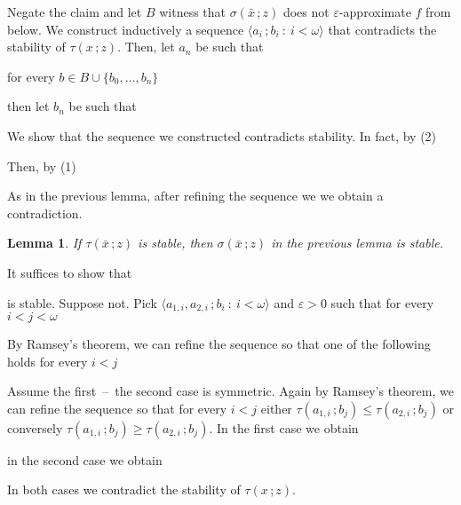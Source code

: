 \documentclass{amsproc}
\makeatletter
\newcounter{thm}
\theoremstyle{mio}
\newtheorem{lemma}[thm]{Lemma}\tcolorboxenvironment{lemma}{mythm}
\providecommand{\proofNameStyle}{\bfseries}
\renewenvironment{proof}[1][\proofname]{\par
  \pushQED{\qed}%
  \normalfont%
  \trivlist
  \item[\hskip\labelsep
        \proofNameStyle
    #1\@addpunct{.}]\ignorespaces
}{%
  \popQED\endtrivlist\@endpefalse
}
\makeatother
\begin{document}
\begin{proof}
  Negate the claim and let $B$ witness that $\sigma(\bar x\,;z)$ does not $\varepsilon$-approximate $f$ from below.
  We construct inductively a sequence $\langle a_i\,;b_i\ :\ i<\omega\rangle$ that contradicts the stability of $\tau(x\,;z)$.
  Then, let $a_n$ be such that

  \hfill for every $b\in B\cup\{b_0,\dots,b_n\}$

  then let $b_n$ be such that


  We show that the sequence we constructed contradicts stability.
  In fact, by (2)


  Then, by (1)


  As in the previous lemma, after refining the sequence we we obtain a contradiction.
\end{proof}

\begin{lemma}
  If $\tau(\bar x\,;z)$ is stable, then $\sigma(\bar x\,;z)$ in the previous lemma is stable. 
\end{lemma}

\begin{proof}
  It suffices to show that


  is stable.
  Suppose not.
  Pick $\langle a_{1,i},a_{2,i}\,;b_i\ :\ i<\omega\rangle$ and $\varepsilon>0$  such that for every $i<j<\omega$


  By Ramsey's theorem, we can refine the sequence so that one of the following holds for every $i<j$

  

Assume the first~--~the second case is symmetric.
Again by Ramsey's theorem, we can refine the sequence so that for every $i<j$ either  $\tau(a_{1,i}\,;b_j)\le\tau(a_{2,i}\,;b_j)$ or conversely $\tau(a_{1,i}\,;b_j)\ge\tau(a_{2,i}\,;b_j)$.
In the first case we obtain


in the second case we obtain


In both cases we contradict the stability of $\tau(x\,;z)$.
\end{proof}
\end{document}
